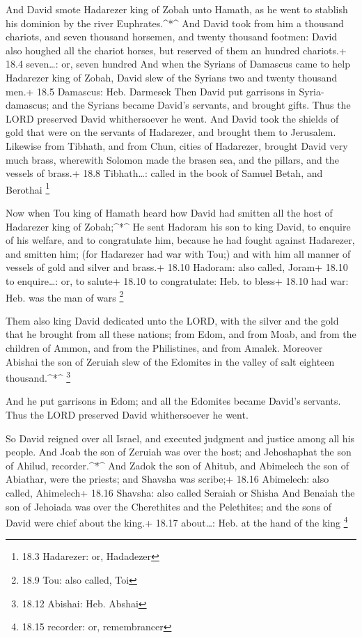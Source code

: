  And David smote Hadarezer king of Zobah unto Hamath, as he
went to stablish his dominion by the river Euphrates.\^{}*\^{}
 And David took from him a thousand chariots, and seven
thousand horsemen, and twenty thousand footmen: David also houghed all
the chariot horses, but reserved of them an hundred chariots.+ 18.4
seven\ldots: or, seven hundred  And when the Syrians of
Damascus came to help Hadarezer king of Zobah, David slew of the Syrians
two and twenty thousand men.+ 18.5 Damascus: Heb. Darmesek 
Then David put garrisons in Syria-damascus; and the Syrians became
David's servants, and brought gifts. Thus the LORD preserved David
whithersoever he went.  And David took the shields of gold
that were on the servants of Hadarezer, and brought them to Jerusalem.
 Likewise from Tibhath, and from Chun, cities of Hadarezer,
brought David very much brass, wherewith Solomon made the brasen sea,
and the pillars, and the vessels of brass.+ 18.8 Tibhath\ldots: called
in the book of Samuel Betah, and Berothai \footnote{18.3 Hadarezer: or,
  Hadadezer}

 Now when Tou king of Hamath heard how David had smitten all
the host of Hadarezer king of Zobah;\^{}*\^{}  He sent
Hadoram his son to king David, to enquire of his welfare, and to
congratulate him, because he had fought against Hadarezer, and smitten
him; (for Hadarezer had war with Tou;) and with him all manner of
vessels of gold and silver and brass.+ 18.10 Hadoram: also called,
Joram+ 18.10 to enquire\ldots: or, to salute+ 18.10 to congratulate:
Heb. to bless+ 18.10 had war: Heb. was the man of wars \footnote{18.9
  Tou: also called, Toi}

 Them also king David dedicated unto the LORD, with the
silver and the gold that he brought from all these nations; from Edom,
and from Moab, and from the children of Ammon, and from the Philistines,
and from Amalek.  Moreover Abishai the son of Zeruiah slew
of the Edomites in the valley of salt eighteen thousand.\^{}*\^{}
\footnote{18.12 Abishai: Heb. Abshai}

 And he put garrisons in Edom; and all the Edomites became
David's servants. Thus the LORD preserved David whithersoever he went.

 So David reigned over all Israel, and executed judgment
and justice among all his people.  And Joab the son of
Zeruiah was over the host; and Jehoshaphat the son of Ahilud,
recorder.\^{}*\^{}  And Zadok the son of Ahitub, and
Abimelech the son of Abiathar, were the priests; and Shavsha was
scribe;+ 18.16 Abimelech: also called, Ahimelech+ 18.16 Shavsha: also
called Seraiah or Shisha  And Benaiah the son of Jehoiada
was over the Cherethites and the Pelethites; and the sons of David were
chief about the king.+ 18.17 about\ldots: Heb. at the hand of the king
\footnote{18.15 recorder: or, remembrancer}

